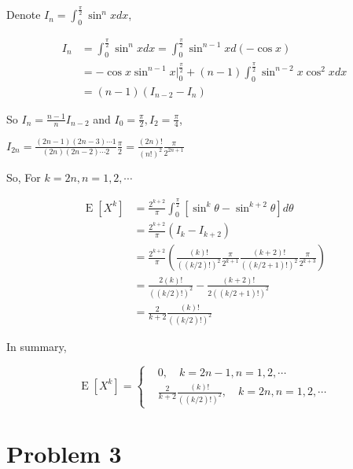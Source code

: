 \documentclass{article}
\begin{document}
Denote $I_n = \int_{0}^{\frac \pi {2}} \sin^n x dx$,

\begin{equation}
    \begin{aligned}
        I_{n} & =  \int_{0}^{\frac \pi {2}} \sin^n x dx =  \int_{0}^{\frac \pi {2}} \sin^{n-1} x d(-\cos x) \\
        & = -\cos x\sin^{n-1} x \big|_{0}^{\frac \pi {2}} + (n-1)  \int_{0}^{\frac \pi {2}} \sin^{n-2}x\cos^2 x dx \\
        & = (n-1)(I_{n-2}-I_n)
    \end{aligned}
\end{equation}

So $I_n = \frac{n-1}{n} I_{n-2}$ and $I_0 = \frac{\pi}{2},I_2 = \frac{\pi}{4}$, 

$I_{2n}= \frac{(2n-1)(2n-3)\cdots 1}{(2n)(2n-2)\cdots 2} \frac {\pi} {2} = \frac {(2n)!} {(n!)^2 } \frac{\pi}{ 2^{2n+1}}$

So, For $k=2n,n=1,2,\cdots$


\begin{equation}
    \begin{aligned}
        \operatorname{E}[X^k] & =  \frac {2^{k+2}}{\pi}\int_{0}^{\frac \pi {2}} \left[\sin^k\theta  - \sin^{k+2}\theta \right] d\theta \\ 
        & = \frac {2^{k+2}}{\pi} \left(I_k - I_{k+2}\right) \\
        & = \frac {2^{k+2}}{\pi} \left( \frac {(k)!} {((k/2)!)^2 } \frac{\pi}{ 2^{k+1}} \frac {(k+2)!} {((k/2+1)!)^2 } \frac{\pi}{ 2^{k+3}} \right) \\
        & = \frac {2(k)!} {((k/2)!)^2 } - \frac {(k+2)!} {2((k/2+1)!)^2 } \\
        & = \frac{2}{k+2} \frac {(k)!} {((k/2)!)^2 }
    \end{aligned}
\end{equation}


In summary,

\begin{equation}
    \operatorname{E}[X^k] = \left\{
    \begin{aligned}
        &0, \quad k=2n-1,n=1,2,\cdots \\
        &\frac{2}{k+2} \frac {(k)!} {((k/2)!)^2 }, \quad k=2n,n=1,2,\cdots
    \end{aligned}
    \right.
\end{equation}

\section{Problem 3}
\end{document}
